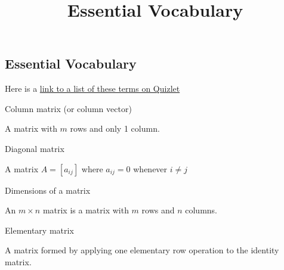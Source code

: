 \documentclass{ximera}
\title{Essential Vocabulary} \license{CC BY-NC-SA 4.0}
\begin{document}
\begin{abstract}
\end{abstract}
\maketitle


\begin{onlineOnly}
\section*{Essential Vocabulary}
Here is a  \href{https://quizlet.com/880920377/chapter-4-vocabulary-flash-cards/?i=y06sd&x=1jqt}{link to a list of these terms on Quizlet}
\end{onlineOnly}

Column matrix (or column vector)
\begin{expandable}
    A matrix with $m$ rows and only 1 column.
\end{expandable}


Diagonal matrix
\begin{expandable}
    A matrix $A=[a_{ij}]$  where $a_{ij}=0$ whenever $i \ne j$
\end{expandable}


Dimensions of a matrix
\begin{expandable}
    An $m \times n$ matrix is a matrix with $m$ rows and $n$ columns.
\end{expandable}


Elementary matrix
\begin{expandable}
    A matrix formed by applying one elementary row operation to the identity matrix.
\end{expandable}

\end{document}
